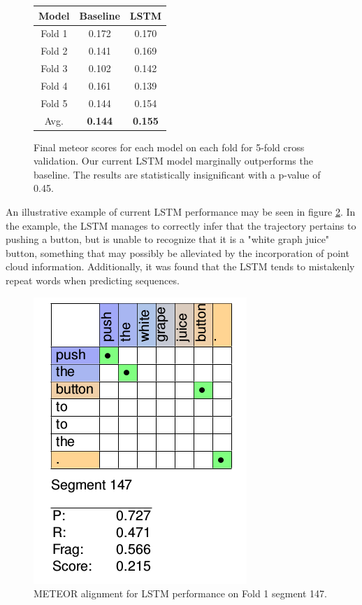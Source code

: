 \documentclass[letterpaper, 12 pt, conference]{ieeeconf}
\begin{document}
\begin{figure}[h]
\centering
\begin{tabular}{|c | c | c |}
\hline
\textbf{Model} & \textbf{Baseline} & \textbf{LSTM} \\
\hline
Fold 1 & 0.172 & 0.170\\
\hline
Fold 2 & 0.141 & 0.169 \\
\hline
Fold 3 & 0.102 & 0.142 \\
\hline
Fold 4 & 0.161 & 0.139 \\
\hline
Fold 5 & 0.144 & 0.154 \\
\hline
Avg. & \textbf{0.144} & \textbf{0.155} \\
\hline
\end{tabular}
\caption{Final meteor scores for each model on each fold for 5-fold cross validation. Our current LSTM model marginally outperforms the baseline. The results are statistically insignificant with a p-value of 0.45.}
\label{fig:score_table}
\end{figure}

An illustrative example of current  LSTM performance may be seen in figure \ref{fig:lstm_alignment}. In the example, the LSTM manages to correctly infer that the trajectory pertains to pushing a button, but is unable to recognize that it is a "white graph juice" button, something that may possibly be alleviated by the incorporation of point cloud information. Additionally, it was found that the LSTM tends to mistakenly repeat words when predicting sequences. 

\begin{figure}[h]
\centering
\includegraphics[scale=0.5]{lstm_alignment}
\caption{METEOR alignment for LSTM performance on Fold 1 segment 147.} 
\label{fig:lstm_alignment}
\end{figure}
\end{document}
